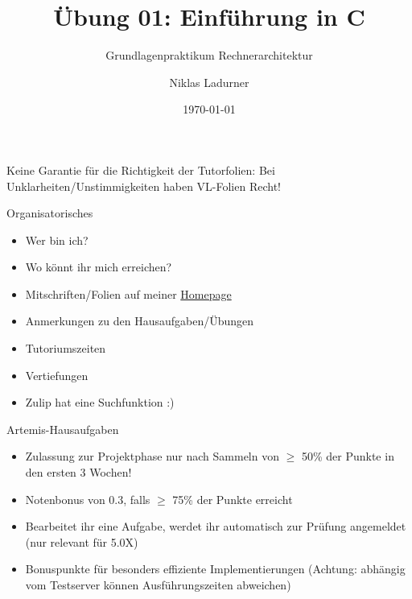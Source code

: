 \documentclass[
  german,            %
  aspectratio=169,    %
]{tumbeamer}
\title{Übung 01: Einführung in C}
\subtitle{Grundlagenpraktikum Rechnerarchitektur}
\author{Niklas Ladurner}
\institute{\theChairName\\\theDepartmentName\\\theUniversityName}
\date[\today]{\today}
\begin{document}
\maketitle

\begin{frame}[c]{}{}
  \begin{center}
    \LARGE  Keine Garantie für die Richtigkeit der Tutorfolien: Bei Unklarheiten/Unstimmigkeiten
    haben VL-Folien Recht!
  \end{center}
\end{frame}

\begin{frame}[c]{Organisatorisches}{}
  \begin{itemize}
    \item Wer bin ich?
    \item Wo könnt ihr mich erreichen?
    \item Mitschriften/Folien auf meiner \href{https://home.in.tum.de/~ladu/}{Homepage}
    \item Anmerkungen zu den Hausaufgaben/Übungen
    \item Tutoriumszeiten
    \item Vertiefungen
    \item Zulip hat eine Suchfunktion :)
  \end{itemize}
\end{frame}

\begin{frame}[c]{Artemis-Hausaufgaben}{}
  \begin{itemize}
    \item Zulassung zur Projektphase nur nach Sammeln von $\ge$ 50\%
          der Punkte in den ersten 3 Wochen!
    \item Notenbonus von 0.3, falls $\ge$ 75\% der Punkte erreicht
    \item Bearbeitet ihr eine Aufgabe, werdet ihr automatisch zur Prüfung
          angemeldet (nur relevant für 5.0X)
    \item Bonuspunkte für besonders effiziente Implementierungen (Achtung: abhängig
          vom Testserver können Ausführungszeiten abweichen)
  \end{itemize}
\end{frame}
\end{document}
